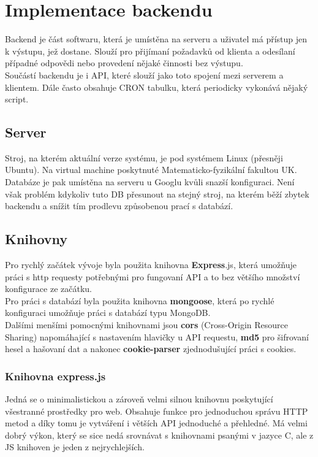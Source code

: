 \chapter{Implementace backendu}
Backend je část softwaru, která je umístěna na serveru a uživatel
má přístup jen k výstupu, jež dostane. Slouží pro přijímaní požadavků od
klienta a odesílaní případné odpovědi nebo provedení nějaké činnosti bez výstupu. 
\\
Součástí backendu je i API, které slouží jako toto spojení mezi
serverem a klientem. Dále často obsahuje CRON tabulku, která periodicky
vykonává nějaký script.

\section{Server}
Stroj, na kterém  aktuální verze systému, je pod systémem Linux (přesněji Ubuntu).
Na virtual machine poskytnuté Matematicko-fyzikální fakultou UK.
\\
Databáze je pak umístěna na serveru u Googlu kvůli snazší konfiguraci.
Není však problém kdykoliv tuto DB přesunout na stejný stroj, na kterém běží
zbytek backendu a snížit tím prodlevu způsobenou prací s databází.


\section{Knihovny}
Pro rychlý začátek vývoje byla použita knihovna \textbf{Express}.js, která
umožňuje práci s http requesty potřebnými pro fungovaní API a to 
bez většího množství konfigurace ze začátku.
\\
Pro práci s databází byla použita knihovna \textbf{mongoose}, která po rychlé konfiguraci
umožňuje práci s databází typu MongoDB.
\\
Dalšími menšími pomocnými knihovnami jsou
\textbf{cors} (Cross-Origin Resource Sharing) napomáhající s nastavením hlavičky u API requestu,
\textbf{md5} pro šifrovaní hesel a hašovaní dat a nakonec
\textbf{cookie-parser} zjednodušující práci s cookies.

\subsection{Knihovna express.js}
Jedná se o minimalistickou a zároveň velmi silnou knihovnu poskytující všestranné prostředky pro web.
Obsahuje funkce pro jednoduchou správu HTTP metod a díky tomu je vytváření i větších API jednoduché a přehledné.
Má velmi dobrý výkon, který se sice nedá srovnávat s knihovnami psanými v jazyce C, ale
z JS knihoven je jeden z nejrychlejších.

